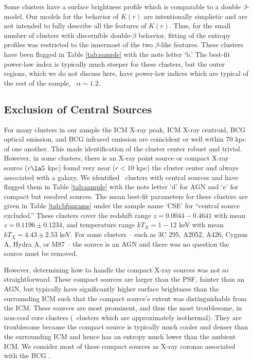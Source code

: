 \documentclass{emulateapj}
\begin{document}
Some clusters have a surface brightness profile which is comparable to
a double $\beta$-model. Our models for the behavior of $K(r)$ are
intentionally simplistic and are not intended to fully describe all
the features of $K(r)$. Thus, for the small number of clusters with
discernible double-$\beta$ behavior, fitting of the entropy profiles
was restricted to the innermost of the two $\beta$-like
features. These clusters have been flagged in Table \ref{tab:sample}
with the note letter `b.' The best-fit power-law index is typically
much steeper for these clusters, but the outer regions, which we do
not discuss here, have power-law indices which are typical of the rest
of the sample, \ie\ $\alpha \sim 1.2$.


\subsection{Exclusion of Central Sources}
\label{sec:centsrc}

For many clusters in our sample the ICM X-ray peak, ICM X-ray
centroid, BCG optical emission, and BCG infrared emission are
coincident or well within 70 kpc of one another. This made
identification of the cluster center robust and trivial. However, in
some clusters, there is an X-ray point source or compact X-ray source
($r \la 5$ kpc) found very near ($r < 10$ kpc) the cluster center and
always associated with a galaxy. We identified \centsrcnum\ clusters
with central sources and have flagged them in Table \ref{tab:sample}
with the note letter `d' for AGN and `e' for compact but resolved
sources. The mean best-fit parameters for these clusters are given in
Table \ref{tab:bfparams} under the sample name `CSE' for ``central
source excluded.'' These clusters cover the redshift range $z =
0.0044-0.4641$ with mean $z = 0.1196 \pm 0.1234$, and temperature
range $kT_X = 1-12$ keV with mean $kT_X = 4.43 \pm 2.53$ keV. For some
clusters -- such as 3C 295, A2052, A426, Cygnus A, Hydra A, or M87 --
the source is an AGN and there was no question the source must be
removed.

However, determining how to handle the compact X-ray sources was not
so straightforward. These compact sources are larger than the PSF,
fainter than an AGN, but typically have significantly higher surface
brightness than the surrounding ICM such that the compact source's
extent was distinguishable from the ICM. These sources are most
prominent, and thus the most troublesome, in non-cool core clusters
(\ie\ clusters which are approximately isothermal). They are
troublesome because the compact source is typically much cooler and
denser than the surrounding ICM and hence has an entropy much lower
than the ambient ICM. We consider most of these compact sources as
X-ray coronae associated with the BCG \citep[see][for discussion of
  BCG coronae]{coronae}.
\end{document}
